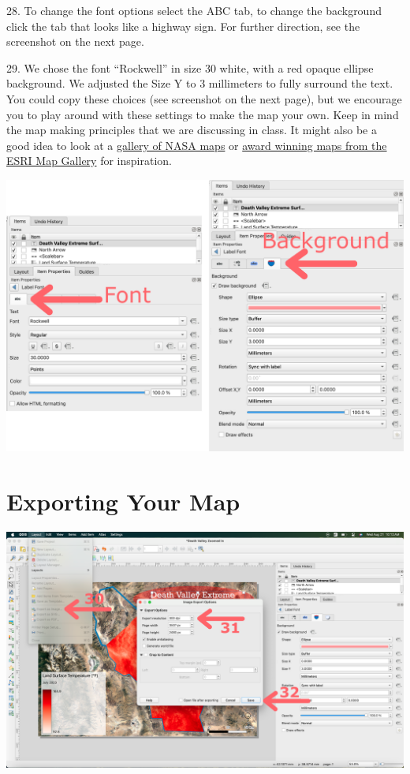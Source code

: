 \documentclass[oneside,a4paper,11pt,explicit]{book}
\begin{document}
28. To change the font options select the ABC tab, to change the background click the tab that looks like a highway sign. For further direction, see the screenshot on the next page.

29.  We chose the font ``Rockwell'' in size 30 white, with a red opaque ellipse background. We adjusted the Size Y to 3 millimeters to fully surround the text. You could copy these choices (see screenshot on the next page), but we encourage you to play around with these settings to make the map your own. Keep in mind the map making principles that we are discussing in class. It might also be a good idea to look at a \href{https://science.nasa.gov/earth/multimedia/}{gallery of NASA maps} or \href{https://mapgallery.esri.com/}{award winning maps from the ESRI Map Gallery} for inspiration. 

\centerline{\includegraphics[width=.75\textwidth]{AdjustTitle.png}}

\section{Exporting Your Map}

\centerline{\includegraphics[width=\textwidth]{MapExport.png}}
\end{document}
